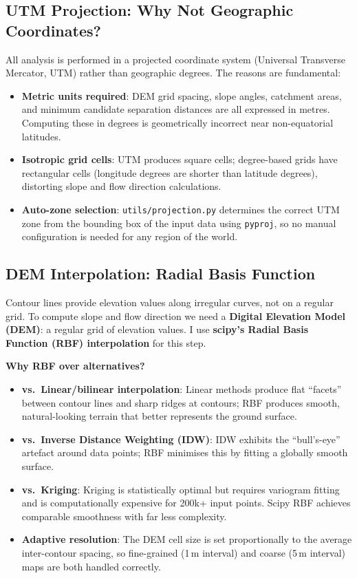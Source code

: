 \documentclass[12pt,a4paper]{article}
\begin{document}
\subsection{UTM Projection: Why Not Geographic Coordinates?}

All analysis is performed in a projected coordinate system (Universal Transverse Mercator, UTM) rather than geographic degrees. The reasons are fundamental:

\begin{itemize}
\item \textbf{Metric units required}: DEM grid spacing, slope angles, catchment areas, and minimum candidate separation distances are all expressed in metres. Computing these in degrees is geometrically incorrect near non-equatorial latitudes.
\item \textbf{Isotropic grid cells}: UTM produces square cells; degree-based grids have rectangular cells (longitude degrees are shorter than latitude degrees), distorting slope and flow direction calculations.
\item \textbf{Auto-zone selection}: \texttt{utils/projection.py} determines the correct UTM zone from the bounding box of the input data using \texttt{pyproj}, so no manual configuration is needed for any region of the world.
\end{itemize}

\subsection{DEM Interpolation: Radial Basis Function}

Contour lines provide elevation values along irregular curves, not on a regular grid. To compute slope and flow direction we need a \textbf{Digital Elevation Model (DEM)}: a regular grid of elevation values. I use \textbf{scipy's Radial Basis Function (RBF) interpolation} for this step.

\textbf{Why RBF over alternatives?}

\begin{itemize}
\item \textbf{vs.\ Linear/bilinear interpolation}: Linear methods produce flat ``facets'' between contour lines and sharp ridges at contours; RBF produces smooth, natural-looking terrain that better represents the ground surface.
\item \textbf{vs.\ Inverse Distance Weighting (IDW)}: IDW exhibits the ``bull's-eye'' artefact around data points; RBF minimises this by fitting a globally smooth surface.
\item \textbf{vs.\ Kriging}: Kriging is statistically optimal but requires variogram fitting and is computationally expensive for 200k+ input points. Scipy RBF achieves comparable smoothness with far less complexity.
\item \textbf{Adaptive resolution}: The DEM cell size is set proportionally to the average inter-contour spacing, so fine-grained (1\,m interval) and coarse (5\,m interval) maps are both handled correctly.
\end{itemize}
\end{document}
